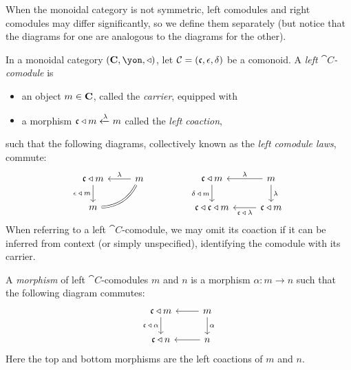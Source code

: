 \documentclass[Book-Poly]{subfiles}
\begin{document}
When the monoidal category is not symmetric, left comodules and right comodules may differ significantly, so we define them separately (but notice that the diagrams for one are analogous to the diagrams for the other).

\begin{definition}\label{def.left_comod}
In a monoidal category $(\Cat{C},\yon,\tri)$, let $\mathcal{C}=(\mathfrak{c},\epsilon,\delta)$ be a comonoid.
A \emph{left $\cat{C}$-comodule} is
\begin{itemize}
    \item an object $m\in\mathbf{C}$, called the \emph{carrier}, equipped with
    \item a morphism $\mathfrak{c}\mathbin{\triangleleft} m\xleftarrow{\lambda}m$ called the \emph{left coaction},
\end{itemize}
such that the following diagrams, collectively known as the \emph{left comodule laws}, commute:
\begin{equation} \label{eqn.left_comod_laws}
\begin{tikzcd}[ampersand replacement=\&]
	\car{c}\tri m\ar[d, "\epsilon\:\tri\:m"']\&
	m\ar[l, "\lambda"']\ar[dl, equal, bend left]\\
	m
\end{tikzcd}
\hspace{.6in}
\begin{tikzcd}[ampersand replacement=\&]
	\car{c}\tri m\ar[d, "\delta\:\tri\:m"']\&
	m\ar[l, "\lambda"']\ar[d, "\lambda"]\\
	\car{c}\tri\car{c}\tri m\&
	\car{c}\tri m\ar[l, "\car{c}\:\tri\:\lambda"]
\end{tikzcd}
\end{equation}
When referring to a left $\cat{C}$-comodule, we may omit its coaction if it can be inferred from context (or simply unspecified), identifying the comodule with its carrier.

A \emph{morphism} of left $\cat{C}$-comodules $m$ and $n$ is a morphism $\alpha\colon m\to n$ such that the following diagram commutes:
\[
\begin{tikzcd}
	\car{c}\tri m \ar[d, "\car{c}\:\tri\:\alpha"'] &
	m \ar[l] \ar[d, "\alpha"] \\
	\car{c}\tri n &
	n \ar[l]
\end{tikzcd}
\]
Here the top and bottom morphisms are the left coactions of $m$ and $n$.
\end{definition}
\end{document}
